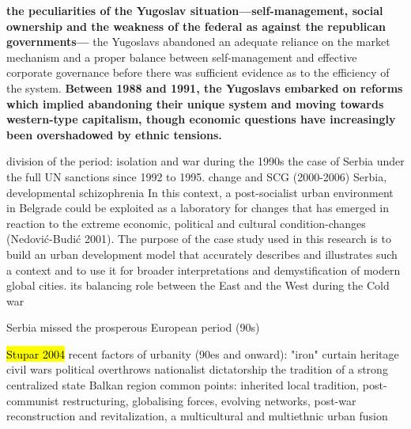 \documentclass[11pt]{report}
\begin{document}
\textbf{the peculiarities of the Yugoslav situation—self-management,  social ownership and the  weakness  of the federal  as against  the  republican  governments—}
the  Yugoslavs  abandoned  an  adequate reliance  on  the  market  mechanism  and  a  proper  balance  between  self-management  and  effective  corporate  governance before  there  was  sufficient evidence as to the efficiency  of the system.
\textbf{Between  1988  and  1991,  the  Yugoslavs  embarked  on  reforms  which implied  abandoning  their  unique  system  and  moving  towards western-type capitalism,  though  economic  questions  have  increasingly  been  overshadowed by  ethnic  tensions.}

division of the period:
isolation and war during the 1990s
the case of Serbia under the full UN sanctions since 1992 to 1995. 
change and SCG (2000-2006)
Serbia, developmental schizophrenia
In this context, a post-socialist urban environment in Belgrade could be exploited as a laboratory for changes that has emerged in reaction to the extreme economic, political and cultural condition-changes (Nedović-Budić 2001). The purpose of the case study used in this research is to build an urban development model that accurately describes and illustrates such a context and to use it for broader interpretations and demystification of modern global cities.
its balancing role between the East and the West during the Cold war

Serbia missed the prosperous European period (90s)

\hl{Stupar 2004}
recent factors of urbanity (90es and onward):
    "iron" curtain heritage
    civil wars
    political overthrows
    nationalist dictatorship
    the tradition of a strong centralized state
Balkan region common points:
    inherited local tradition,
    post-communist restructuring,
    globalising forces,
    evolving networks,
    post-war reconstruction and revitalization,
    a multicultural and multiethnic urban fusion
\end{document}
